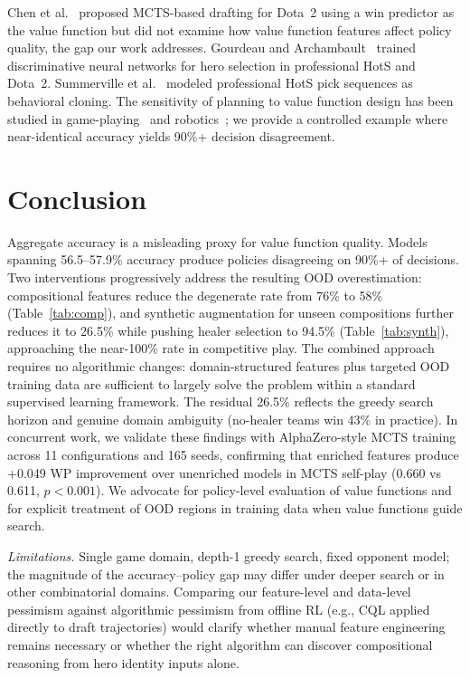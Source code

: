 \documentclass[conference]{IEEEtran}
\begin{document}
Chen et al.~\cite{chen2018drafting} proposed MCTS-based drafting for Dota~2 using a win predictor as the value function but did not examine how value function features affect policy quality, the gap our work addresses. Gourdeau and Archambault~\cite{gourdeau2021discriminative} trained discriminative neural networks for hero selection in professional HotS and Dota~2. Summerville et al.~\cite{summerville2016draft} modeled professional HotS pick sequences as behavioral cloning. The sensitivity of planning to value function design has been studied in game-playing~\cite{silver2016mastering} and robotics~\cite{kalashnikov2018qtopt}; we provide a controlled example where near-identical accuracy yields 90\%+ decision disagreement.

\section{Conclusion}

Aggregate accuracy is a misleading proxy for value function quality. Models spanning 56.5--57.9\% accuracy produce policies disagreeing on 90\%+ of decisions. Two interventions progressively address the resulting OOD overestimation: compositional features reduce the degenerate rate from 76\% to 58\% (Table~\ref{tab:comp}), and synthetic augmentation for unseen compositions further reduces it to 26.5\% while pushing healer selection to 94.5\% (Table~\ref{tab:synth}), approaching the near-100\% rate in competitive play. The combined approach requires no algorithmic changes: domain-structured features plus targeted OOD training data are sufficient to largely solve the problem within a standard supervised learning framework. The residual 26.5\% reflects the greedy search horizon and genuine domain ambiguity (no-healer teams win 43\% in practice). In concurrent work, we validate these findings with AlphaZero-style MCTS training across 11 configurations and 165 seeds, confirming that enriched features produce +0.049 WP improvement over unenriched models in MCTS self-play (0.660 vs 0.611, $p\!<\!0.001$). We advocate for policy-level evaluation of value functions and for explicit treatment of OOD regions in training data when value functions guide search.

\textit{Limitations.} Single game domain, depth-1 greedy search, fixed opponent model; the magnitude of the accuracy--policy gap may differ under deeper search or in other combinatorial domains. Comparing our feature-level and data-level pessimism against algorithmic pessimism from offline RL (e.g., CQL applied directly to draft trajectories) would clarify whether manual feature engineering remains necessary or whether the right algorithm can discover compositional reasoning from hero identity inputs alone.
\end{document}
